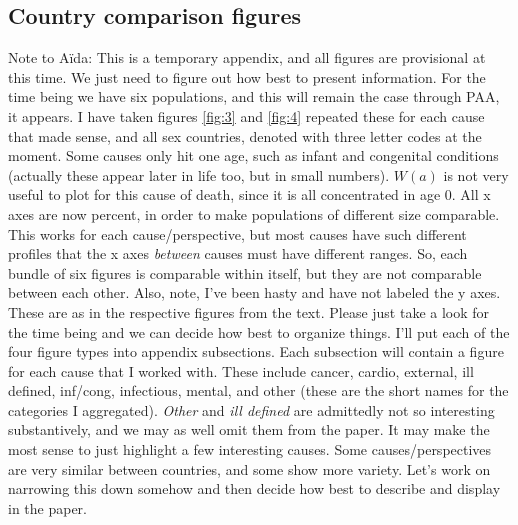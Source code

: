 \documentclass{article}
\begin{document}
\begin{appendices}
\section{Country comparison figures}
Note to A{\"i}da:
This is a temporary appendix, and all figures are provisional at this time. We
just need to figure out how best to present information. For the time being we
have six populations, and this will remain the case through PAA, it appears.
I have taken figures \ref{fig:3} and \ref{fig:4} repeated these for each cause
that made sense, and all sex countries, denoted with three letter codes at the
moment. Some causes only hit one age, such as infant and
congenital conditions (actually these appear later in life too, but in small numbers). $W(a)$ is not very useful to plot for this
cause of death, since it is all concentrated in age 0. All x axes are now
percent, in order to make populations of different size comparable. This works
for each cause/perspective, but most causes have such different profiles that
the x axes \textit{between} causes must have different ranges. So, each bundle
of six figures is comparable within itself, but they are not comparable between
each other. Also, note, I've been hasty and have not labeled the y axes. These
are as in the respective figures from the text. Please just take a look for the
time being and we can decide how best to organize things. I'll put each of the
four figure types into appendix subsections. Each subsection will contain a
figure for each cause that I worked with. These include cancer, cardio,
external, ill defined, inf/cong, infectious, mental, and other (these are the
short names for the categories I aggregated).
\textit{Other} and \textit{ill defined} are admittedly not so interesting
substantively, and we may as well omit them from the paper. It may make the
most sense to just highlight a few interesting causes. Some causes/perspectives
are very similar between countries, and some show more variety. Let's work on
narrowing this down somehow and then decide how best to describe and display in
the paper. 

\pagebreak

\end{appendices}
\end{document}
